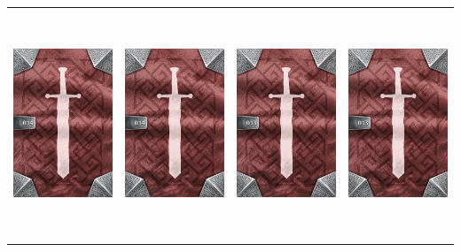 \documentclass{minimal}
\begin{document}
{\begin{longtable}{llll}
\includegraphics[width=44mm,height=68mm]{./1-14/gh-014-minor-power-potion-back.png} &
\includegraphics[width=44mm,height=68mm]{./1-14/gh-014-minor-power-potion-back.png} &
\includegraphics[width=44mm,height=68mm]{./1-14/gh-013-minor-stamina-potion-back.png} &
\includegraphics[width=44mm,height=68mm]{./1-14/gh-013-minor-stamina-potion-back.png}\\ 

\end{longtable}}
\end{document}
